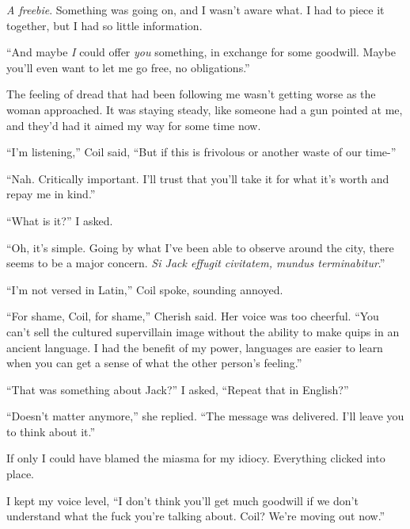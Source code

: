 \emph{A freebie}.  Something was going on, and I wasn't aware what.  I had to piece it together, but I had so little information.



``And maybe \emph{I }could offer \emph{you} something, in exchange for some goodwill.  Maybe you'll even want to let me go free, no obligations.''



The feeling of dread that had been following me wasn't getting worse as the woman approached.  It was staying steady, like someone had a gun pointed at me, and they'd had it aimed my way for some time now.



``I'm listening,'' Coil said, ``But if this is frivolous or another waste of our time-''



``Nah.  Critically important.  I'll trust that you'll take it for what it's worth and repay me in kind.''



``What is it?'' I asked.



``Oh, it's simple.  Going by what I've been able to observe around the city, there seems to be a major concern.  \emph{Si Jack effugit civitatem, mundus terminabitur}.''



``I'm not versed in Latin,''  Coil spoke, sounding annoyed.



``For shame, Coil, for shame,'' Cherish said.  Her voice was too cheerful. ``You can't sell the cultured supervillain image without the ability to make quips in an ancient language.  I had the benefit of my power, languages are easier to learn when you can get a sense of what the other person's feeling.''



``That was something about Jack?''  I asked,  ``Repeat that in English?''



``Doesn't matter anymore,'' she replied.  ``The message was delivered.  I'll leave you to think about it.''



If only I could have blamed the miasma for my idiocy.  Everything clicked into place.



I kept my voice level, ``I don't think you'll get much goodwill if we don't understand what the fuck you're talking about.  Coil?  We're moving out now.''



